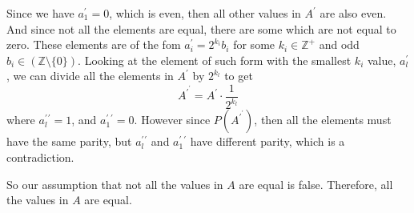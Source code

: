 \documentclass[12pt]{article}
\newcommand{\Z}{\mathbb{Z}}
\newcommand{\p}{^{\prime}}
\begin{document}
Since we have $a_1\p=0$, which is even, then all other values in $A\p$ are also even. And since not all the elements are equal, there are some which are not equal to zero. These elements are of the fom $a_i\p=2^{k_i}b_i$ for some $k_i\in\Z^+$ and odd $b_i\in(\Z\setminus\{0\})$. Looking at the element of such form with the smallest $k_i$ value, $a_l\p$, we can divide all the elements in $A\p$ by $2^{k_l}$ to get 
\[A\p\p = A\p \cdot \frac{1}{2^{k_l}}\]
where $a_l\p\p=1$, and $a_1\p\p=0$. However since $P(A\p\p)$, then all the elements must have the same parity, but $a_l\p\p$ and $a_1\p\p$ have different parity, which is a contradiction.

So our assumption that not all the values in $A$ are equal is false. Therefore, all the values in $A$ are equal.
\end{document}
